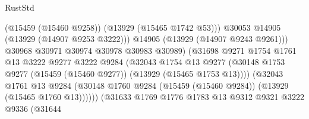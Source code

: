 \begin{lexlean}{RustStd}
\begin{coremodule}
                                                (@15459 (@15460 @9258))
                                                (@13929 (@15465 @1742 @53)))
                                              @30053
                                              @14905
                                              (@13929 (@14907 @9253 @3222)))
                                            @14905
                                            (@13929 (@14907 @9243 @9261)))
                                          @30968
                                          @30971
                                          @30974
                                          @30978
                                          @30983
                                          @30989)
                                        (@31698
                                          @9271
                                          @1754
                                          @1761
                                          @13
                                          @3222
                                          @9277
                                          @3222
                                          @9284
                                          (@32043
                                            @1754
                                            @13
                                            @9277
                                            (@30148
                                              @1753
                                              @9277
                                              (@15459 (@15460 @9277))
                                              (@13929 (@15465 @1753 @13))))
                                          (@32043
                                            @1761
                                            @13
                                            @9284
                                            (@30148
                                              @1760
                                              @9284
                                              (@15459 (@15460 @9284))
                                              (@13929 (@15465 @1760 @13))))))
                                      (@31633
                                        @1769
                                        @1776
                                        @1783
                                        @13
                                        @9312
                                        @9321
                                        @3222
                                        @9336
                                        (@31644

\end{coremodule}
\end{lexlean}
